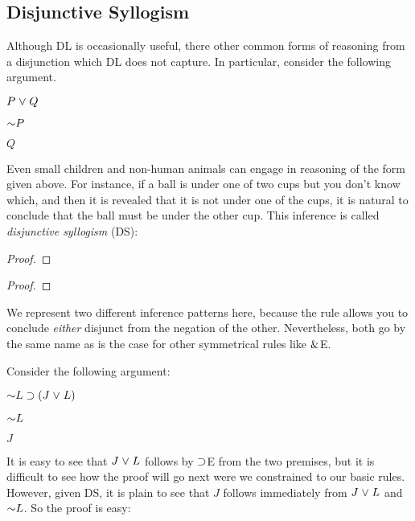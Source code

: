 \subsection{Disjunctive Syllogism}

Although DL is occasionally useful, there other common forms of reasoning from a disjunction which DL does not capture.
In particular, consider the following argument.

\begin{earg}
\item[] $P \mkern1mu\vee\mkern1mu Q$
\item[] $\enot P$
\item[\therefore] $Q$
\end{earg}

Even small children and non-human animals can engage in reasoning of the form given above.
For instance, if a ball is under one of two cups but you don't know which, and then it is revealed that it is not under one of the cups, it is natural to conclude that the ball must be under the other cup.
This inference is called \textit{disjunctive syllogism} (DS):

\begin{multicols}{2}

\begin{proof}
	\metaA{} 
\end{proof}

\begin{proof}
	\metaB{} 
\end{proof}

\end{multicols}

We represent two different inference patterns here, because the rule allows you to conclude \emph{either} disjunct from the negation of the other.
Nevertheless, both go by the same name as is the case for other symmetrical rules like $\mathrel\&$E.

Consider the following argument:

\begin{earg}
\item[] $\enot L \eif (J \eor L)$
\item[] $\enot L$
\item[\therefore] $J$
\end{earg}

It is easy to see that $J\mkern1mu\vee\mkern1mu L$ follows by $\supset$E from the two premises, but it is difficult to see how the proof will go next were we constrained to our basic rules.
However, given DS, it is plain to see that $J$ follows immediately from $J\mkern1mu\vee\mkern1mu L$ and $\enot L$. 
So the proof is easy:

